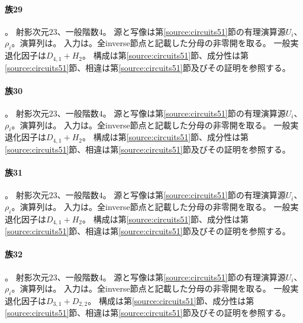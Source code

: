 \paragraph{族29}\label{catalogue:T29}
。
射影次元$23$、一般階数$4$。
源と写像は第\ref{source:circuits51}節の有理演算源$U_i$、$\rho_i$。演算列は。
入力は。全inverse節点と記載した分母の非零開を取る。
一般実退化因子は$D_{4,1}+H_{2}$。
構成は第\ref{source:circuits51}節、成分性は第\ref{source:circuits51}節、相違は第\ref{source:circuits51}節及びその証明を参照する。

\paragraph{族30}\label{catalogue:T30}
。
射影次元$23$、一般階数$4$。
源と写像は第\ref{source:circuits51}節の有理演算源$U_i$、$\rho_i$。演算列は。
入力は。全inverse節点と記載した分母の非零開を取る。
一般実退化因子は$D_{4,1}+H_{2}$。
構成は第\ref{source:circuits51}節、成分性は第\ref{source:circuits51}節、相違は第\ref{source:circuits51}節及びその証明を参照する。

\paragraph{族31}\label{catalogue:T31}
。
射影次元$23$、一般階数$4$。
源と写像は第\ref{source:circuits51}節の有理演算源$U_i$、$\rho_i$。演算列は。
入力は。全inverse節点と記載した分母の非零開を取る。
一般実退化因子は$D_{4,1}+H_{2}$。
構成は第\ref{source:circuits51}節、成分性は第\ref{source:circuits51}節、相違は第\ref{source:circuits51}節及びその証明を参照する。

\paragraph{族32}\label{catalogue:T32}
。
射影次元$23$、一般階数$4$。
源と写像は第\ref{source:circuits51}節の有理演算源$U_i$、$\rho_i$。演算列は。
入力は。全inverse節点と記載した分母の非零開を取る。
一般実退化因子は$D_{3,1}+D_{2,2}$。
構成は第\ref{source:circuits51}節、成分性は第\ref{source:circuits51}節、相違は第\ref{source:circuits51}節及びその証明を参照する。

